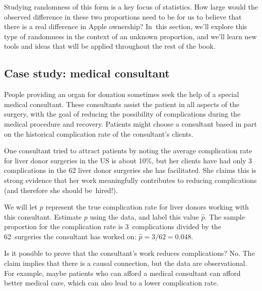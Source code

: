 Studying randomness of this form is a key focus of statistics. How large would the observed difference in these two proportions need to be for us to believe that there is a real difference in Apple ownership? In~this section, we'll explore this type of randomness in the context of an unknown proportion, and we'll learn new tools and ideas that will be applied throughout the rest of the book.

\subsection{Case study: medical consultant}

People providing an organ for donation sometimes seek the help of a special medical consultant. These consultants assist the patient in all aspects of the surgery, with the goal of reducing the possibility of complications during the medical procedure and recovery. Patients might choose a consultant based in part on the historical complication rate of the consultant's clients.

One consultant tried to attract patients by noting the average complication rate for liver donor surgeries in the US is about 10\%, but her clients have had only 3 complications in the 62 liver donor surgeries she has facilitated. She claims this is strong evidence that her work meaningfully contributes to reducing complications (and therefore she should be~hired!).

\begin{example}{We will let $p$ represent the true complication rate for liver donors working with this consultant. Estimate $p$ using the data, and label this value $\hat{p}$.}
The sample proportion for the complication rate is 3~complications divided by the 62~surgeries the consultant has worked on: $\hat{p} = 3/62 = 0.048$.
\end{example}

\begin{example}{Is it possible to prove that the consultant's work reduces complications?}
No. The claim implies that there is a causal connection, but the data are observational. For example, maybe patients who can afford a medical consultant can afford better medical care, which can also lead to a lower complication rate.
\end{example}

